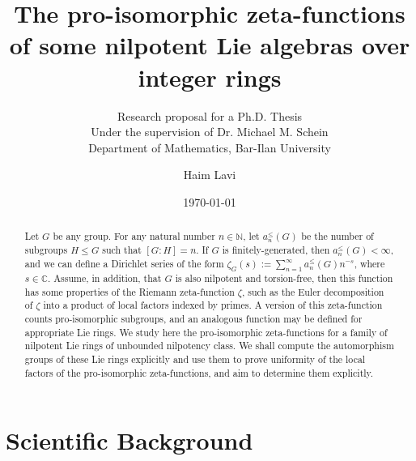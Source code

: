 \documentclass[12pt]{article}
\title{The pro-isomorphic zeta-functions of some nilpotent Lie algebras over integer rings}
\subtitle{Research proposal for a Ph.D. Thesis\\
Under the supervision of Dr. Michael M. Schein\\
Department of Mathematics, Bar-Ilan University}
\author{Haim Lavi}
\date{\today}
\begin{document}
\maketitle
\newpage
\tableofcontents
\newpage
\begin{abstract}
Let $G$ be any group. For any natural number $n\in\mathbb{N}$, let $a_{n}^{\leq}(G)$ be the number of subgroups $H\leq G$ such that $[G:H]=n$. If $G$ is finitely-generated, then $a_{n}^{\leq}(G)<\infty$, and we can define a Dirichlet series of the form $\zeta_G(s):=\sum_{n=1}^\infty a_{n}^{\leq}(G){n}^{-s}$, where $s\in\mathbb{C}$. Assume, in addition, that $G$ is also nilpotent and torsion-free, then this function has some properties of the Riemann zeta-function $\zeta$, such as the Euler decomposition of $\zeta$ into a product of local factors indexed by primes. A version of this zeta-function counts pro-isomorphic subgroups, and an analogous function may be defined for appropriate Lie rings. We study here the pro-isomorphic zeta-functions for a family of nilpotent Lie rings of unbounded nilpotency class. We shall compute the automorphism groups of these Lie rings explicitly and use them to prove uniformity of the local factors of the pro-isomorphic zeta-functions, and aim to determine them explicitly.
\end{abstract}
\section{Scientific Background}
\end{document}
